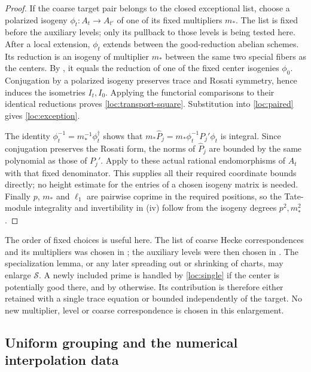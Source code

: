 \begin{proof}
If the coarse target pair belongs to the closed exceptional list,
choose a polarized isogeny $\phi_t:A_t\to A_{t'}$ of one of its fixed
multipliers $m_*$.  The list is fixed before the auxiliary levels;
only its pullback to those levels is being tested here.  After a local
extension, $\phi_t$ extends between the good-reduction abelian schemes.
Its reduction is an isogeny of multiplier $m_*$ between the same two
special fibers as the centers.  By , it
equals the reduction of one of the fixed center isogenies $\phi_0$.
Conjugation by a polarized isogeny preserves trace and Rosati
symmetry, hence induces the isometries $I_t,I_0$.  Applying the
functorial comparisons to their identical reductions proves
\eqref{loc:transport-square}.  Substitution into
\eqref{loc:paired} gives \eqref{loc:exception}.

The identity $\phi_t^{-1}=m_*^{-1}\phi_t^\dagger$ shows that
$m_*\widehat P_j=m_*\phi_t^{-1}P_j'\phi_t$ is integral.  Since
conjugation preserves the Rosati form, the norms of
$\widehat P_j$ are bounded by the same polynomial as those of $P_j'$.
Apply  to these actual rational endomorphisms
of $A_t$ with that fixed denominator.  This supplies all their required
coordinate bounds directly; no height estimate for the entries of a
chosen isogeny matrix is needed.  Finally $p$, $m_*$ and $\ell_1$ are
pairwise coprime in the required positions, so the Tate-module
integrality and invertibility in (iv) follow from the isogeny degrees
$p^2,m_*^2$.
\end{proof}

The order of fixed choices is useful here.  The list of coarse Hecke
correspondences and its multipliers was chosen in
; the auxiliary levels were then chosen in
.  The specialization lemma, or any later spreading
out or shrinking of charts, may enlarge $\mathcal S$.  A newly included
prime is handled by \eqref{loc:single} if the center is potentially
good there, and by  otherwise.  Its contribution is
therefore either retained with a single trace equation or bounded
independently of the target.  No new multiplier, level or coarse
correspondence is chosen in this enlargement.

\subsection{Uniform grouping and the numerical interpolation data}

